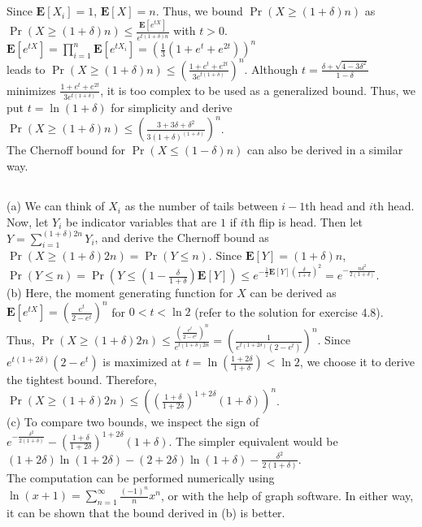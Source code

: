 \documentclass{article}
\begin{document}
\subsection{}
Since $\textbf{E}[X_i]=1$, $\textbf{E}[X]=n$. Thus, we bound $\Pr(X\geq (1+\delta)n)$ as\\
$\Pr(X\geq (1+\delta)n)\leq\frac{\textbf{E}[e^{tX}]}{e^{t(1+\delta)n}}$ with $t>0$. $\textbf{E}[e^{tX}]=\prod\limits_{i=1}^n\textbf{E}[e^{tX_i}]=\left(\frac{1}{3}(1+e^t+e^{2t})\right)^n$\\
leads to $\Pr(X\geq (1+\delta)n)\leq\left(\frac{1+e^t+e^{2t}}{3e^{t(1+\delta)}}\right)^n$.
Although $t=\frac{\delta+\sqrt{4-3\delta^2}}{1-\delta}$ minimizes $\frac{1+e^t+e^{2t}}{3e^{t(1+\delta)}}$, it is too complex to be used as a generalized bound.
Thus, we put $t=\ln(1+\delta)$ for simplicity and derive $\Pr(X\geq (1+\delta)n)\leq\left(\frac{3+3\delta+\delta^2}{3(1+\delta)^{(1+\delta)}}\right)^n$.\\
The Chernoff bound for $\Pr(X\leq(1-\delta)n)$ can also be derived in a similar way.
\subsection{}
(a) We can think of $X_i$ as the number of tails between $i-1$th head and $i$th head.
Now, let $Y_i$ be indicator variables that are $1$ if $i$th flip is head.
Then let $Y=\sum\limits_{i=1}^{(1+\delta)2n}Y_i$, and derive the Chernoff bound as $\Pr(X\geq(1+\delta)2n)=\Pr(Y\leq n)$.
Since $\textbf{E}[Y]=(1+\delta)n$, $\Pr(Y\leq n)=\Pr(Y\leq (1-\frac{\delta}{1+\delta})\textbf{E}[Y])\leq e^{-\frac{1}{2}\textbf{E}[Y](\frac{\delta}{1+\delta})^2}=e^{-\frac{n\delta^2}{2(1+\delta)}}$.\\
(b) Here, the moment generating function for $X$ can be derived as $\textbf{E}[e^{tX}]=\left(\frac{e^t}{2-e^t}\right)^n$ for $0 < t < \ln 2$ (refer to the solution for exercise 4.8).\\
Thus, $\Pr(X\geq(1+\delta)2n)\leq\frac{(\frac{e^t}{2-e^t})^n}{e^{t(1+\delta)2n}}=\left(\frac{1}{e^{t(1+2\delta)}(2-e^t)}\right)^n$.
Since $e^{t(1+2\delta)}(2-e^t)$ is maximized at $t=\ln(\frac{1+2\delta}{1+\delta}) < \ln 2$, we choose it to derive the tightest bound.
Therefore, $\Pr(X\geq(1+\delta)2n)\leq\left((\frac{1+\delta}{1+2\delta})^{1+2\delta}(1+\delta)\right)^n$.\\
(c) To compare two bounds, we inspect the sign of $e^{-\frac{\delta^2}{2(1+\delta)}}-(\frac{1+\delta}{1+2\delta})^{1+2\delta}(1+\delta)$.
The simpler equivalent would be $(1+2\delta)\ln(1+2\delta)-(2+2\delta)\ln(1+\delta)-\frac{\delta^2}{2(1+\delta)}$.\\
The computation can be performed numerically using $\ln(x+1)=\sum\limits_{n=1}^\infty\frac{(-1)^n}{n}x^n$, or with the help of graph software.
In either way, it can be shown that the bound derived in (b) is better.
\end{document}
